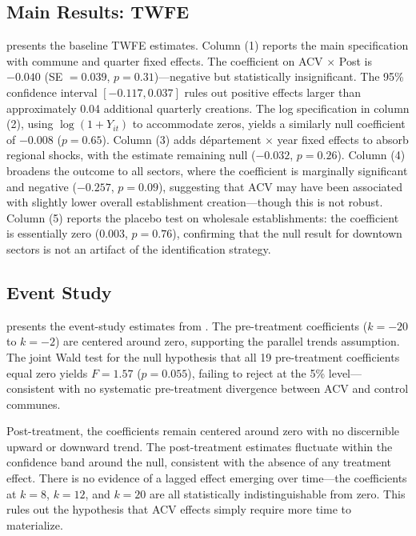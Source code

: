 \documentclass[12pt]{article}
\begin{document}
\subsection{Main Results: TWFE}

 presents the baseline TWFE estimates. Column (1) reports the main specification with commune and quarter fixed effects. The coefficient on ACV $\times$ Post is $-0.040$ (SE $= 0.039$, $p = 0.31$)---negative but statistically insignificant. The 95\% confidence interval $[-0.117, 0.037]$ rules out positive effects larger than approximately 0.04 additional quarterly creations. The log specification in column (2), using $\log(1 + Y_{it})$ to accommodate zeros, yields a similarly null coefficient of $-0.008$ ($p = 0.65$). Column (3) adds d\'epartement $\times$ year fixed effects to absorb regional shocks, with the estimate remaining null ($-0.032$, $p = 0.26$). Column (4) broadens the outcome to all sectors, where the coefficient is marginally significant and negative ($-0.257$, $p = 0.09$), suggesting that ACV may have been associated with slightly lower overall establishment creation---though this is not robust. Column (5) reports the placebo test on wholesale establishments: the coefficient is essentially zero ($0.003$, $p = 0.76$), confirming that the null result for downtown sectors is not an artifact of the identification strategy.



\subsection{Event Study}

 presents the event-study estimates from . The pre-treatment coefficients ($k = -20$ to $k = -2$) are centered around zero, supporting the parallel trends assumption. The joint Wald test for the null hypothesis that all 19 pre-treatment coefficients equal zero yields $F = 1.57$ ($p = 0.055$), failing to reject at the 5\% level---consistent with no systematic pre-treatment divergence between ACV and control communes.

Post-treatment, the coefficients remain centered around zero with no discernible upward or downward trend. The post-treatment estimates fluctuate within the confidence band around the null, consistent with the absence of any treatment effect. There is no evidence of a lagged effect emerging over time---the coefficients at $k = 8$, $k = 12$, and $k = 20$ are all statistically indistinguishable from zero. This rules out the hypothesis that ACV effects simply require more time to materialize.
\end{document}
